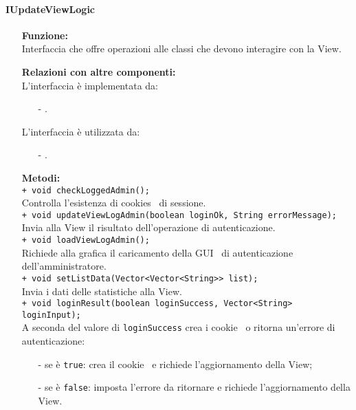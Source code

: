{{\begin{sloppypar}
{		

		
		\paragraph{IUpdateViewLogic}\label{par:IUpdateViewLogic}{
			\begin{itemize}
				\item[]  \textbf{Funzione:} \\
				Interfaccia che offre operazioni alle classi che devono interagire con la View.\\
				
				\item[]  \textbf{Relazioni con altre componenti:} \\
				L'interfaccia è implementata da:
				\begin{itemize}
					\item[-] .
				\end{itemize}
				L’interfaccia è utilizzata da:
				\begin{itemize}
					\item[-] .\\
				\end{itemize}
				
				\item[]  \textbf{Metodi:}\\
					\texttt{+ void checkLoggedAdmin();}\\
					Controlla l’esistenza di cookies\g~ di sessione.\\
					
					\texttt{+ void updateViewLogAdmin(boolean loginOk, String errorMessage);}\\
					Invia alla View il risultato dell’operazione di autenticazione.\\
					
					\texttt{+ void loadViewLogAdmin();}\\
					Richiede alla grafica il caricamento della GUI\g~ di autenticazione dell’amministratore.\\
					
					\texttt{+ void setListData(Vector<Vector<String>> list);}\\
					Invia i dati delle statistiche alla View.\\
					
					\texttt{+ void loginResult(boolean loginSuccess, Vector<String> loginInput);}\\
					A seconda del valore di \texttt{loginSuccess} crea i cookie\g~ o ritorna un’errore di autenticazione:
					\begin{itemize}
						\item[-] se è \texttt{true}: crea il cookie\g~ e richiede l’aggiornamento della View;
						\item[-] se è \texttt{false}: imposta l’errore da ritornare e richiede l’aggiornamento della View.\\
					\end{itemize}
					

\end{itemize}}}
\end{sloppypar}}}

